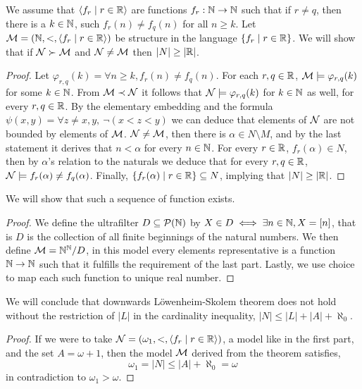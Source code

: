\question{}
\subquestion{}
We assume that $\langle f_r \mid r \in \mathbb{R} \rangle$ are functions $f_r : \mathbb{N} \to \mathbb{N}$ such that if $r \ne q$, then there is a $k \in \mathbb{N}$, such $f_r(n) \ne f_q(n)$ for all $n \ge k$.
Let $\mathcal{M} = (\mathbb{N}, <, \langle f_r \mid r \in \mathbb{R} \rangle)$ be structure in the language $\{ f_r \mid r \in \mathbb{R} \}$.
We will show that if $\mathcal{N} \succ \mathcal{M}$ and $\mathcal{N} \ne \mathcal{M}$ then $|N| \ge |\mathbb{R}|$.
\begin{proof}
	Let $\varphi_{r, q}(k) = \forall n \ge k, f_r(n) \ne f_q(n)$.
	For each $r, q \in \mathbb{R}$, $\mathcal{M} \models \varphi_{r, q}(k)$ for some $k \in \mathbb{N}$.
	From $\mathcal{M} \prec \mathcal{N}$ it follows that $\mathcal{N} \models \varphi_{r, q}(k)$ for $k \in \mathbb{N}$ as well, for every $r, q \in \mathbb{R}$.
	By the elementary embedding and the formula $\psi(x, y) = \forall z \ne x, y,\ \lnot (x < z < y)$ we can deduce that elements of $\mathcal{N}$ are not bounded by elements of $\mathcal{M}$.
	$\mathcal{N} \ne \mathcal{M}$, then there is $\alpha \in N \setminus M$, and by the last statement it derives that $n < \alpha$ for every $n \in \mathbb{N}$.
	For every $r \in \mathbb{R}$, $f_r(\alpha) \in N$, then by $\alpha$'s relation to the naturals we deduce that for every $r, q \in \mathbb{R}$, $\mathcal{N} \models f_r(\alpha) \ne f_q(\alpha)$.
	Finally, $\{ f_r(\alpha) \mid r \in \mathbb{R} \} \subseteq N$, implying that $|N| \ge |\mathbb{R}|$.
\end{proof}

\subquestion{}
We will show that such a sequence of function exists.
\begin{proof}
	We define the ultrafilter $D \subseteq \mathcal{P}(\mathbb{N})$ by $X \in D \iff \exists n \in \mathbb{N}, X = [n]$, that is $D$ is the collection of all finite beginnings of the natural numbers.
	We then define $\mathcal{M} = \mathbb{N}^{\mathbb{N}} / D$, in this model every elements representative is a function $\mathbb{N} \to \mathbb{N}$ such that it fulfills the requirement of the last part.
	Lastly, we use choice to map each such function to unique real number.
\end{proof}

\subquestion{}
We will conclude that downwards Löwenheim-Skolem theorem does not hold without the restriction of $|L|$ in the cardinality inequality, $|N| \le |L| + |A| + \aleph_0$.
\begin{proof}
	If we were to take $\mathcal{N} = (\omega_1, <, \langle f_r \mid r \in \mathbb{R} \rangle)$, a model like in the first part, and the set $A = \omega + 1$, then the model $\mathcal{M}$ derived from the theorem satisfies,
	\[
		\omega_1 = |N| \le |A| + \aleph_0 = \omega
	\]
	in contradiction to $\omega_1 > \omega$.
\end{proof}

